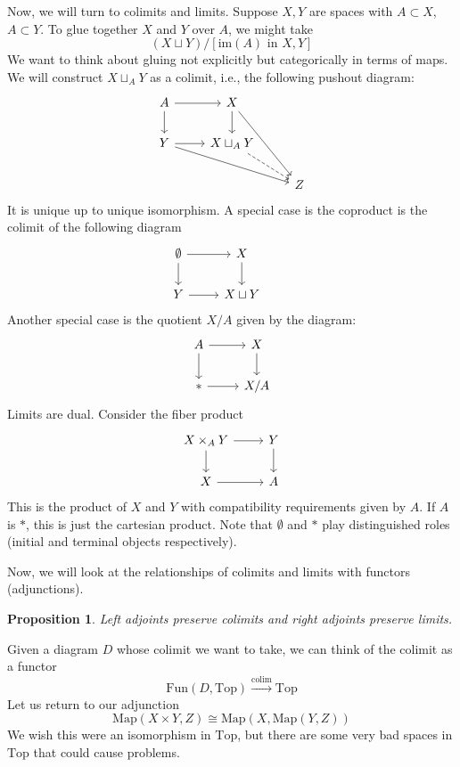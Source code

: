 \documentclass[12pt]{article}
\newtheorem{proposition}[theorem]{Proposition}
\theoremstyle{definition}
\begin{document}
	Now, we will turn to colimits and limits. Suppose $X,Y$ are spaces with $A\subset X$, $A\subset Y$. To glue together $X$ and $Y$ over $A$, we might take 
	$$(X\sqcup Y)/[\text{im}(A)\text{ in }X,Y] $$
	We want to think about gluing not explicitly but categorically in terms of maps. We will construct $X\sqcup_{A}Y$ as a colimit, i.e., the following pushout diagram:
	$$\begin{tikzcd}
	A \arrow[r] \arrow[d]   & X \arrow[d] \arrow[rdd]         &   \\
	Y \arrow[r] \arrow[rrd] & X\sqcup_{A}Y \arrow[rd, dashed] &   \\
	&                                 & Z
	\end{tikzcd}$$
	It is unique up to unique isomorphism. A special case is the coproduct is the colimit of the following diagram
	$$\begin{tikzcd}
	\emptyset \arrow[r] \arrow[d] & X \arrow[d] &   \\
	Y \arrow[r]                   & X\sqcup Y   
	\end{tikzcd}$$
	Another special case is the quotient $X/A$ given by the diagram: 
	$$\begin{tikzcd}
	A \arrow[r] \arrow[d] & X \arrow[d] \\
	* \arrow[r]           & X/A        
	\end{tikzcd}$$
	Limits are dual. Consider the fiber product 
	$$\begin{tikzcd}
	X\times_{A}Y \arrow[r] \arrow[d] & Y \arrow[d] \\
	X \arrow[r]                      & A          
	\end{tikzcd}$$
	This is the product of $X$ and $Y$ with compatibility requirements given by $A$. If $A$ is $*$, this is just the cartesian product. Note that $\emptyset$ and $*$ play distinguished roles (initial and terminal objects respectively).
	
	Now, we will look at the relationships of colimits and limits with functors (adjunctions). 
	\begin{proposition}
		Left adjoints preserve colimits and right adjoints preserve limits. 
	\end{proposition}
	Given a diagram $D$ whose colimit we want to take, we can think of the colimit as a functor 
	$$\text{Fun}(D,\text{Top})\xrightarrow{\text{colim}}\text{Top} $$
	Let us return to our adjunction
	$$\text{Map}(X\times Y,Z)\cong\text{Map}(X,\text{Map}(Y,Z)) $$
	We wish this were an isomorphism in $\text{Top}$, but there are some very bad spaces in $\text{Top}$ that could cause problems. 
	
\end{document}
